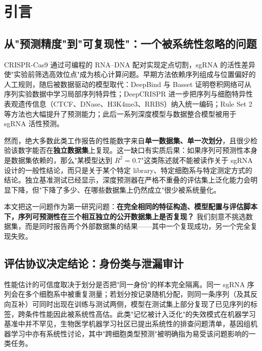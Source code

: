 \section{引言}
\label{sec:intro}

\subsection{从"预测精度"到"可复现性"：一个被系统性忽略的问题}

CRISPR-Cas9 通过可编程的 RNA--DNA 配对实现定点切割，sgRNA 的活性差异使"实验前筛选高效位点"成为核心计算问题\citep{Jinek2012Science,Cong2013Science,Shalem2014Science}。早期方法依赖序列组成与位置偏好的人工规则\citep{Doench2014NatBiotechnol,MorenoMateos2015NatMethods}，随后被数据驱动的模型取代：DeepBind 与 Basset 证明卷积网络可从序列实验数据中学习局部序列特异性\citep{Alipanahi2015NatBiotechnol,Kelley2016GenomeRes}；DeepCRISPR 进一步把序列与细胞特异性表观遗传信息（CTCF、DNase、H3K4me3、RRBS）纳入统一编码\citep{Chuai2018GenomeBiol}；Rule Set 2 等方法也大幅提升了预测能力\citep{Doench2016NatBiotechnol}；此后一系列深度模型与数据整合模型被用于 sgRNA 活性预测\citep{Kim2018NatBiotechnol,Kim2019SciAdv,Xiang2021NatCommun}。

然而，绝大多数此类工作报告的性能数字来自\textbf{单一数据集、单一次划分}，且很少检验该数字能否在\textbf{独立数据集}上复现。这一缺口有实质后果：如果序列可预测性本身是数据集依赖的，那么"某模型达到 $R^{2}=0.7$"这类陈述就不能被读作关于 sgRNA 设计的一般性结论，而只是关于某个特定 library、特定细胞系与特定测定方式的结论。独立基准测试已经显示，深度预测器在严格不重叠的评估集上泛化能力会明显下降\citep{Zhang2023BriefBioinform,Konstantakos2022NAR,Yuan2025CRISPRJ}，但"下降了多少、在哪些数据集上仍然成立"很少被系统量化。

本文把这一问题作为第一研究问题：\textbf{在完全相同的特征构造、模型配置与评估脚本下，序列可预测性在三个相互独立的公开数据集上是否复现？} 我们刻意不挑选数据集，而是同时报告两个外部数据集的结果——其中一个复现成功，另一个完全复现失败。

\subsection{评估协议决定结论：身份类与泄漏审计}

性能估计的可信度取决于划分是否把"同一身份"的样本完全隔离。同一 sgRNA 序列会在多个细胞系中被重复测量；若划分按记录随机分配，则同一条序列（及其反向互补）可同时出现在训练与测试两侧，模型在测试集上部分复现了已见序列的标签，跨条件性能因此被系统性高估。此类"记忆被计入泛化"的失效模式在机器学习基准中并不罕见\citep{Kaufman2012TKDD,Kapoor2023Patterns}，生物医学机器学习社区已提出系统性的排查问题清单\citep{Bernett2024NatMethods}，基因组机器学习中亦有系统性讨论\citep{Whalen2022NatRevGenet}，其中"跨细胞类型预测"被明确指为易受该问题影响的一类任务\citep{Schreiber2020GenomeBiol}。

